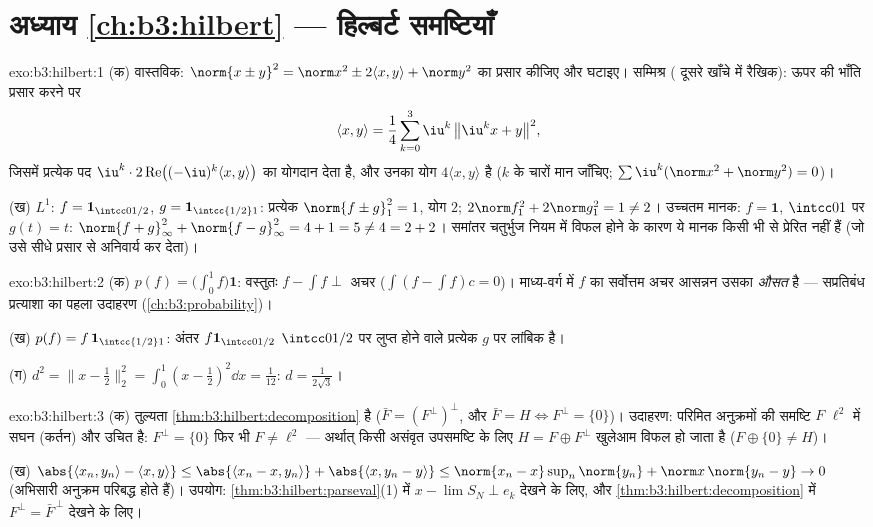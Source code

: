 \section*{अध्याय \ref{ch:b3:hilbert} --- हिल्बर्ट समष्टियाँ}

\begin{solution}{exo:b3:hilbert:1}
(क) वास्तविक: $\norm{x \pm y}^2 = \norm x^2 \pm 2\langle
x,y\rangle + \norm y^2$ का प्रसार कीजिए और घटाइए। सम्मिश्र ( दूसरे
खाँचे में रैखिक): ऊपर की भाँति प्रसार करने पर
\[
\langle x, y\rangle = \frac14\sum_{k=0}^{3}
\iu^k\,\bigl\|\iu^kx + y\bigr\|^2,
\]
जिसमें प्रत्येक पद $\iu^k\cdot2\operatorname{Re}\bigl(
(-\iu)^k\langle x,y\rangle\bigr)$ का योगदान देता है, और उनका योग $4\langle
x,y\rangle$ है ($k$
के चारों मान जाँचिए; $\sum\iu^k
(\norm x^2 + \norm y^2) = 0$)।

(ख) $L^1$: $f = \mathbf 1_{\intcc0{1/2}}$, $g = \mathbf
1_{\intcc{1/2}1}$: प्रत्येक $\norm{f\pm g}_1^2 = 1$, योग $2$; $2\norm f_1^2 + 2\norm g_1^2 = 1 \neq 2$। उच्चतम मानक:
$f =
\mathbf 1$, $\intcc01$ पर $g(t) = t$: $\norm{f + g}_\infty^2 +
\norm{f-g}_\infty^2 = 4 + 1 = 5 \neq 4 = 2 + 2$। समांतर चतुर्भुज नियम में विफल होने के
कारण ये मानक किसी भी  से प्रेरित नहीं हैं (जो उसे सीधे प्रसार
से अनिवार्य कर देता)।
\end{solution}

\begin{solution}{exo:b3:hilbert:2}
(क) $p(f) = \bigl(\int_0^1f\bigr)\mathbf 1$: वस्तुतः $f - \int f
\perp$ अचर ($\int(f - \int f)c = 0$)। माध्य-वर्ग में $f$ का सर्वोत्तम
अचर आसन्नन उसका \emph{औसत} है --- सप्रतिबंध प्रत्याशा का पहला उदाहरण
(\cref{ch:b3:probability})।

(ख) $p(f) = f\,\mathbf 1_{\intcc{1/2}1}$: अंतर $f\mathbf 1_{\intcc0{1/2}}$ $\intcc0{1/2}$ पर लुप्त होने वाले प्रत्येक $g$ पर लांबिक
है।

(ग) $d^2 = \bigl\|x - \tfrac12\bigr\|_2^2 = \int_0^1(x -
\tfrac12)^2\dd x = \tfrac1{12}$: $d = \frac1{2\sqrt3}$।
\end{solution}

\begin{solution}{exo:b3:hilbert:3}
(क) तुल्यता \cref{thm:b3:hilbert:decomposition} है ($\bar F = (F^\perp)^\perp$, और $\bar F = H \iff F^\perp =
\{0\}$)। उदाहरण: परिमित अनुक्रमों की
समष्टि $F$ $\ell^2$ में सघन (कर्तन) और उचित है: $F^\perp = \{0\}$ फिर भी $F
\neq \ell^2$ ---
अर्थात् किसी असंवृत उपसमष्टि के लिए $H = F \oplus
F^\perp$ खुलेआम विफल हो जाता है
($F \oplus \{0\} \neq H$)।

(ख) $\abs{\langle x_n, y_n\rangle - \langle x, y\rangle} \leq
\abs{\langle x_n - x, y_n\rangle} + \abs{\langle x, y_n -
y\rangle} \leq \norm{x_n - x}\sup_n\norm{y_n} + \norm
x\,\norm{y_n - y} \to 0$ (अभिसारी अनुक्रम परिबद्ध होते हैं)। उपयोग: \cref{thm:b3:hilbert:parseval}(1) में
$x - \lim
S_N \perp e_k$ देखने के लिए, और \cref{thm:b3:hilbert:decomposition} में $F^\perp = \bar F^{\,\perp}$ देखने के लिए।
\end{solution}

